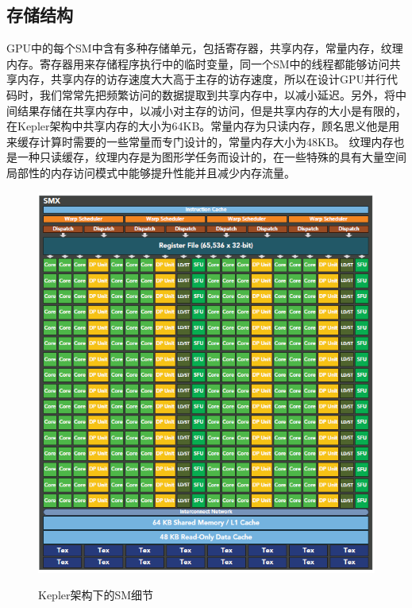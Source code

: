 \subsection{存储结构}
GPU中的每个SM中含有多种存储单元，包括寄存器，共享内存，常量内存，纹理内存。寄存器用来存储程序执行中的临时变量，同一个SM中的线程都能够访问共享内存，共享内存的访存速度大大高于主存的访存速度，所以在设计GPU并行代码时，我们常常先把频繁访问的数据提取到共享内存中，以减小延迟。另外，将中间结果存储在共享内存中，以减小对主存的访问，但是共享内存的大小是有限的，在Kepler架构中共享内存的大小为64KB。常量内存为只读内存，顾名思义他是用来缓存计算时需要的一些常量而专门设计的，常量内存大小为48KB。 纹理内存也是一种只读缓存，纹理内存是为图形学任务而设计的，在一些特殊的具有大量空间局部性的内存访问模式中能够提升性能并且减少内存流量。
\begin{figure}
\setlength{\belowcaptionskip}{-0.5cm}
\begin{center}
{\includegraphics[width=0.8 \textwidth]{figures/smx.png}}
\end{center}
\caption{{\footnotesize{Kepler架构下的SM细节}}}
\label{sm}
\end{figure}
